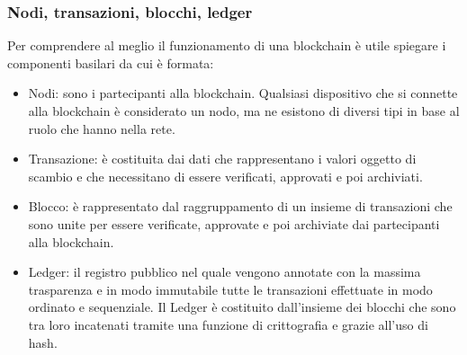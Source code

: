 \subsubsection{Nodi, transazioni, blocchi, ledger}
Per comprendere al meglio il funzionamento di una blockchain è utile spiegare i componenti basilari da cui è formata:
\begin{itemize}
	\item{Nodi:} sono i partecipanti alla blockchain. Qualsiasi dispositivo che si connette alla blockchain è considerato un nodo, ma ne esistono di diversi tipi in base al ruolo che hanno nella rete.
	\item{Transazione:}  è costituita dai dati che rappresentano i valori oggetto di scambio e che necessitano di essere verificati, approvati e poi archiviati.
	\item{Blocco:} è rappresentato dal raggruppamento di un insieme di transazioni che sono unite per essere verificate, approvate e poi archiviate dai partecipanti alla blockchain. 
	\item{Ledger:}  il registro pubblico nel quale vengono annotate con la massima trasparenza e in modo immutabile tutte le transazioni effettuate in modo ordinato e sequenziale. Il Ledger è costituito dall’insieme dei blocchi che sono tra loro incatenati tramite una funzione di crittografia e grazie all’uso di hash.
\end{itemize}

